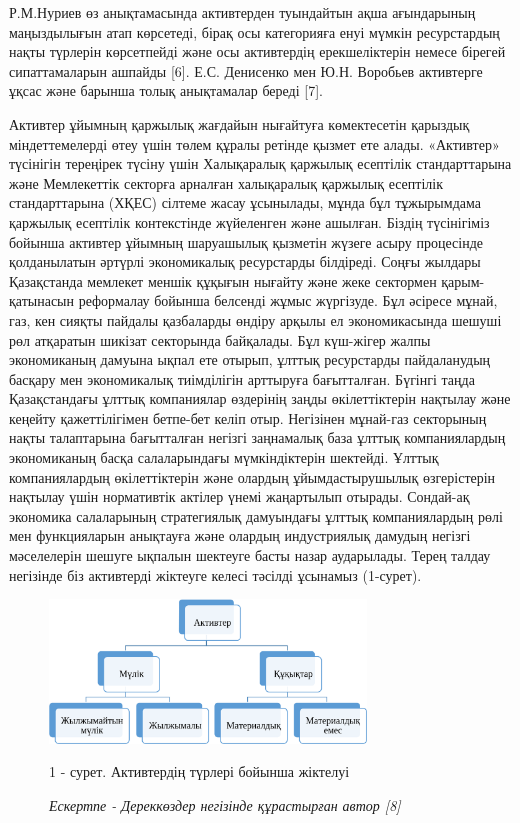 \begin{multicols}{2}
Р.М.Нуриев өз анықтамасында активтерден туындайтын ақша ағындарының
маңыздылығын атап көрсетеді, бірақ осы категорияға енуі мүмкін
ресурстардың нақты түрлерін көрсетпейді және осы активтердің
ерекшеліктерін немесе бірегей сипаттамаларын ашпайды {[}6{]}. Е.С.
Денисенко мен Ю.Н. Воробьев активтерге ұқсас және барынша толық
анықтамалар береді {[}7{]}.

Активтер ұйымның қаржылық жағдайын нығайтуға көмектесетін қарыздық
міндеттемелерді өтеу үшін төлем құралы ретінде қызмет ете алады.
«Активтер» түсінігін тереңірек түсіну үшін Халықаралық қаржылық
есептілік стандарттарына және Мемлекеттік секторға арналған халықаралық
қаржылық есептілік стандарттарына (ХҚЕС) сілтеме жасау ұсынылады, мұнда
бұл тұжырымдама қаржылық есептілік контекстінде жүйеленген және ашылған.
Біздің түсінігіміз бойынша активтер ұйымның шаруашылық қызметін жүзеге
асыру процесінде қолданылатын әртүрлі экономикалық ресурстарды
білдіреді. Соңғы жылдары Қазақстанда мемлекет меншік құқығын нығайту
және жеке сектормен қарым-қатынасын реформалау бойынша белсенді жұмыс
жүргізуде. Бұл әсіресе мұнай, газ, кен сияқты пайдалы қазбаларды өндіру
арқылы ел экономикасында шешуші рөл атқаратын шикізат секторында
байқалады. Бұл күш-жігер жалпы экономиканың дамуына ықпал ете отырып,
ұлттық ресурстарды пайдаланудың басқару мен экономикалық тиімділігін
арттыруға бағытталған. Бүгінгі таңда Қазақстандағы ұлттық компаниялар
өздерінің заңды өкілеттіктерін нақтылау және кеңейту қажеттілігімен
бетпе-бет келіп отыр. Негізінен мұнай-газ секторының нақты талаптарына
бағытталған негізгі заңнамалық база ұлттық компаниялардың экономиканың
басқа салаларындағы мүмкіндіктерін шектейді. Ұлттық компаниялардың
өкілеттіктерін және олардың ұйымдастырушылық өзгерістерін нақтылау үшін
нормативтік актілер үнемі жаңартылып отырады. Сондай-ақ экономика
салаларының стратегиялық дамуындағы ұлттық компаниялардың рөлі мен
функцияларын анықтауға және олардың индустриялық дамудың негізгі
мәселелерін шешуге ықпалын шектеуге басты назар аударылады. Терең талдау
негізінде біз активтерді жіктеуге келесі тәсілді ұсынамыз (1-сурет).
\end{multicols}

\begin{figure}[H]
	\centering
	\includegraphics[width=0.75\textwidth]{media/ekon2/image11}
	\caption*{1 - сурет. Активтердің түрлері бойынша жіктелуі}
	\caption*{\normalfont \emph{Ескертпе - Дереккөздер негізінде құрастырған автор {[}8{]}}}
\end{figure}

